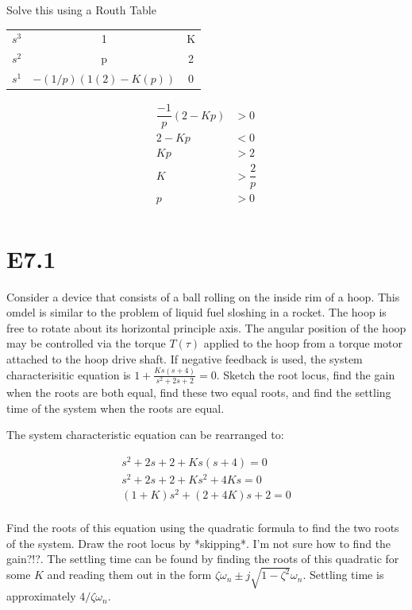 \documentclass[11pt]{article}
\begin{document}
Solve this using a Routh Table

\begin{table}[h]
  \centering
  \begin{tabular}{|c|c|c|}
  \hline
  $s^3$ & 1 & K \\
  $s^2$ & p & 2 \\
  $s^1$ & $-(1/p) (1(2) - K(p))$ & 0 \\
  \hline
  \end{tabular}
\end{table}

\begin{align*}
  \dfrac{-1}{p} (2 - Kp) &> 0 \\
  2 - Kp &< 0 \\
  Kp &> 2 \\
  K &> \dfrac{2}{p} \\
  p &> 0 \\
\end{align*}

\section{E7.1}

Consider a device that consists of a ball rolling on the inside rim of a hoop. This omdel is similar to the problem of liquid fuel sloshing in a rocket. The hoop is free to rotate about its horizontal principle axis. The angular position of the hoop may be controlled via the torque $T(\tau)$ applied to the hoop from a torque motor attached to the hoop drive shaft. If negative feedback is used, the system characterisitic equation is $1 + \frac{Ks(s + 4)}{s^2 + 2s + 2} = 0$. Sketch the root locus, find the gain when the roots are both equal, find these two equal roots, and find the settling time of the system when the roots are equal.

The system characteristic equation can be rearranged to:

\begin{align*}
  s^2 + 2s + 2 + Ks(s + 4) = 0 \\
  s^2 + 2s + 2 + Ks^2 + 4Ks = 0 \\
  (1 + K)s^2 + (2 + 4K)s + 2 = 0 \\
\end{align*}

Find the roots of this equation using the quadratic formula to find the two roots of the system. Draw the root locus by *skipping*. I'm not sure how to find the gain?!?. The settling time can be found by finding the roots of this quadratic for some $K$ and reading them out in the form $\zeta \omega_n \pm j \sqrt{1 - \zeta^2} \omega_n$. Settling time is approximately $4 / \zeta \omega_n$.
\end{document}
